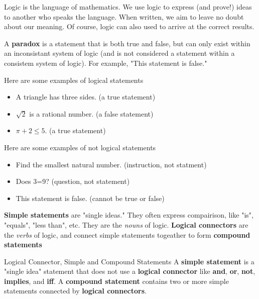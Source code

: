 Logic is the language of mathematics. We use logic to express (and prove!) ideas to another who speaks the language. When written, we aim to leave no doubt about our meaning. Of course, logic can also used to arrive at the correct results.

\begin{boxremark*}{}{}
	A {\bf paradox} is a statement that is both true and false, but can only exist within an inconsistant system of logic (and is not considered a statement within a consistem system of logic). For example, "This statement is false."
\end{boxremark*}

\begin{boxexample}{}{}
	Here are some examples of logical statements
	\begin{itemize}
		\item A triangle has three sides. (a true statement)
		\item $\sqrt 2$ is a rational number. (a false statement)
		\item $\pi + 2 \leq 5$. (a true statement)
	\end{itemize}
\end{boxexample}

\begin{boxexample}{}{}
	Here are some examples of not logical statements
	\begin{itemize}
		\item Find the smallest natural number. (instruction, not statment)
		\item Does 3=9? (question, not statement)
		\item This statement is false. (cannot be true or false)
	\end{itemize}
\end{boxexample}

{\bf Simple statements} are "single ideas." They often express compairison, like "is", "equals", "less than", etc. They are the \emph{nouns} of logic. {\bf Logical connectors} are the \emph{verbs} of logic, and connect simple statements togeather to form {\bf compound statements}

\begin{boxdefine}{Logical Connector, Simple and Compound Statements}{}
	A {\bf simple statement} is a "single idea" statement that does not use a {\bf logical connector} like {\bf and}, {\bf or}, {\bf not}, {\bf implies}, and {\bf iff}.
	A {\bf compound statement} contains two or more simple statements connected by {\bf logical connectors}.
\end{boxdefine}

